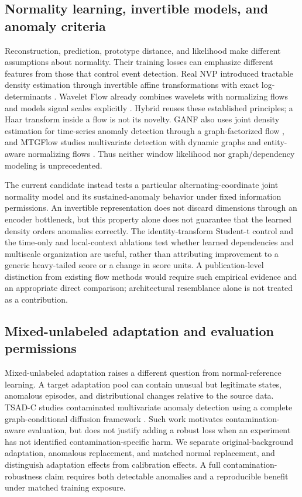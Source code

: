 \documentclass[
  english,
]{article}
\begin{document}
\subsection{Normality learning, invertible models, and anomaly
criteria}\label{normality-learning-invertible-models-and-anomaly-criteria}

Reconstruction, prediction, prototype distance, and likelihood make
different assumptions about normality. Their training losses can
emphasize different features from those that control event detection.
Real NVP introduced tractable density estimation through invertible
affine transformations with exact log-determinants \citep{realnvp2017}.
Wavelet Flow already combines wavelets with normalizing flows and models
signal scales explicitly \citep{waveletflow2020}. Hybrid reuses these
established principles; a Haar transform inside a flow is not its
novelty. GANF also uses joint density estimation for time-series anomaly
detection through a graph-factorized flow \citep{ganf2022}, and MTGFlow
studies multivariate detection with dynamic graphs and entity-aware
normalizing flows \citep{mtgflow2023}. Thus neither window likelihood
nor graph/dependency modeling is unprecedented.

The current candidate instead tests a particular alternating-coordinate
joint normality model and its sustained-anomaly behavior under fixed
information permissions. An invertible representation does not discard
dimensions through an encoder bottleneck, but this property alone does
not guarantee that the learned density orders anomalies correctly. The
identity-transform Student-t control and the time-only and local-context
ablations test whether learned dependencies and multiscale organization
are useful, rather than attributing improvement to a generic
heavy-tailed score or a change in score units. A publication-level
distinction from existing flow methods would require such empirical
evidence and an appropriate direct comparison; architectural resemblance
alone is not treated as a contribution.

\subsection{Mixed-unlabeled adaptation and evaluation
permissions}\label{mixed-unlabeled-adaptation-and-evaluation-permissions}

Mixed-unlabeled adaptation raises a different question from
normal-reference learning. A target adaptation pool can contain unusual
but legitimate states, anomalous episodes, and distributional changes
relative to the source data. TSAD-C studies contaminated multivariate
anomaly detection using a complete graph-conditional diffusion framework
\citep{tsadc2025}. Such work motivates contamination-aware evaluation,
but does not justify adding a robust loss when an experiment has not
identified contamination-specific harm. We separate original-background
adaptation, anomalous replacement, and matched normal replacement, and
distinguish adaptation effects from calibration effects. A full
contamination-robustness claim requires both detectable anomalies and a
reproducible benefit under matched training exposure.
\end{document}
